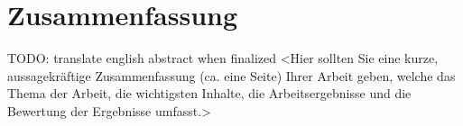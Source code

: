 %

\chapter*{Zusammenfassung}

TODO: translate english abstract when finalized
<Hier sollten Sie eine kurze, aussagekräftige Zusammenfassung (ca. eine Seite) Ihrer Arbeit geben, welche das Thema der Arbeit, die wichtigsten Inhalte, die Arbeitsergebnisse und die Bewertung der Ergebnisse umfasst.> 
